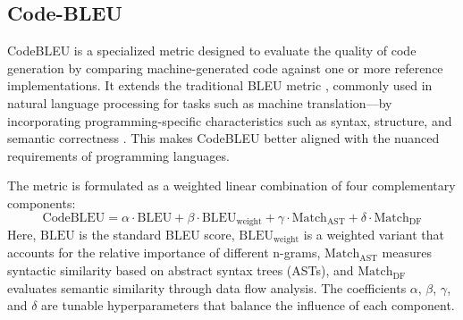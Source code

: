 

\subsection{Code-BLEU}

CodeBLEU is a specialized metric designed to evaluate the quality of code generation by comparing machine-generated code against one or more reference implementations. It extends the traditional BLEU metric \citep{Papineni2002BLEU}, commonly used in natural language processing for tasks such as machine translation—by incorporating programming-specific characteristics such as syntax, structure, and semantic correctness \citep{Ren2020CodeBLEU}. This makes CodeBLEU better aligned with the nuanced requirements of programming languages.

The metric is formulated as a weighted linear combination of four complementary components:
\begin{equation}
    \text{CodeBLEU} = \alpha \cdot \text{BLEU} + \beta \cdot \text{BLEU}_{\text{weight}} + \gamma \cdot \text{Match}_{\text{AST}} + \delta \cdot \text{Match}_{\text{DF}}
\end{equation}
Here, \(\text{BLEU}\) is the standard BLEU score, \(\text{BLEU}_{\text{weight}}\) is a weighted variant that accounts for the relative importance of different n-grams, \(\text{Match}_{\text{AST}}\) measures syntactic similarity based on abstract syntax trees (ASTs), and \(\text{Match}_{\text{DF}}\) evaluates semantic similarity through data flow analysis. The coefficients \(\alpha\), \(\beta\), \(\gamma\), and \(\delta\) are tunable hyperparameters that balance the influence of each component.

